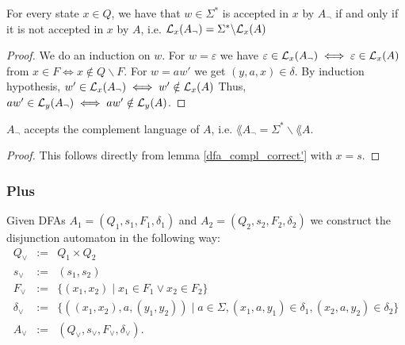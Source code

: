 \begin{lemma}
    \label{dfa_compl_correct'}
    For every state $x \in Q$, we have that $w \in \Sigma^*$ is accepted in $x$ by $A_\neg$ if and only if it is not accepted in $x$ by $A$, i.e. $\mathcal{L}_{x}(A_\neg) = \Sigma^* \backslash \mathcal{L}_{x}(A)$ 
\end{lemma}
\begin{proof}
    We do an induction on $w$.
    For $w = \varepsilon$ we have $\varepsilon \in \mathcal{L}_{x}(A_\neg) \iff \varepsilon \in \mathcal{L}_{x}(A)$ from
    $x \in F \iff x \notin Q\backslash F$.
    For $w = aw'$ we get $(y,a,x) \in \delta$. 
    By induction hypothesis, $w' \in \mathcal{L}_{x}(A_\neg) \iff w' \notin \mathcal{L}_{x}(A)$
    Thus, $aw' \in \mathcal{L}_{y}(A_\neg) \iff aw' \notin \mathcal{L}_{y}(A)$.
\end{proof}
\begin{lemma}
    $A_\neg$ accepts the complement language of $A$, i.e. $\lang{A_\neg} = \Sigma^* \backslash \lang{A}$.
    \label{dfa_compl_correct}
\end{lemma}
\begin{proof}
    This follows directly from lemma \ref{dfa_compl_correct'} with $x = s$.
\end{proof}

\subsubsection{Plus}
\begin{definition}
    Given DFAs $A_1=(Q_1, s_1, F_1, \delta_1)$ and $A_2=(Q_2, s_2, F_2, \delta_2)$ we construct the disjunction automaton  in the following way:
    \begin{eqnarray*}
        Q_\vee &:=& Q_1 \times Q_2 \\
        s_\vee &:=& (s_1, s_2) \\
        F_\vee &:=& \{(x_1,x_2) \; | \; x_1 \in F_1 \vee x_2 \in F_2\} \\
        \delta_\vee &:=& \{( (x_1, x_2),a,(y_1, y_2)) \; | \; a \in \Sigma, (x_1, a, y_1) \in \delta_1, (x_2, a, y_2) \in \delta_2 \} \\
        A_\vee &:=& (Q_\vee, s_\vee, F_\vee, \delta_\vee).
    \end{eqnarray*}
\end{definition}

